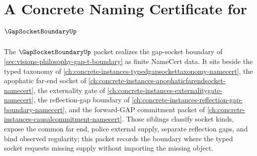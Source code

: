 \chapter{A Concrete Naming Certificate for $\GapSocketBoundaryUp$}
\label{ch:concrete-instances-gap-socket-boundary-namecert}

The $\GapSocketBoundaryUp$ packet realizes the gap-socket boundary of \autoref{sec:visions-philosophy-gap-t-boundary} as finite NameCert data. It sits beside the typed taxonomy of \autoref{ch:concrete-instances-typedgapsockettaxonomy-namecert}, the apophatic far-end socket of \autoref{ch:concrete-instances-apophaticfarendsocket-namecert}, the externality gate of \autoref{ch:concrete-instances-externalitygate-namecert}, the reflection-gap boundary of \autoref{ch:concrete-instances-reflection-gap-boundary-namecert}, and the forward-GAP commitment packet of \autoref{ch:concrete-instances-causalcommitment-namecert}. Those siblings classify socket kinds, expose the common far end, police external supply, separate reflection gaps, and bind observed regularity; this packet records the boundary where the typed socket requests missing supply without importing the missing object.



